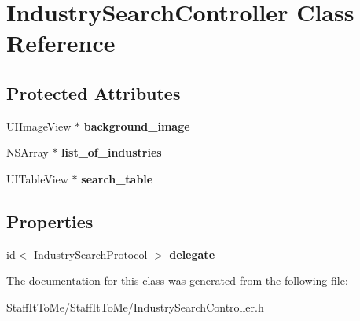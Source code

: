 \hypertarget{interface_industry_search_controller}{
\section{\-Industry\-Search\-Controller \-Class \-Reference}
\label{interface_industry_search_controller}
}
\subsection*{\-Protected \-Attributes}
\begin{DoxyCompactItemize}
\item 
\hypertarget{interface_industry_search_controller_aa442ecdf7c873fde2f8a9e2f973958f0}{
\-U\-I\-Image\-View $\ast$ {\bfseries background\-\_\-image}}
\label{interface_industry_search_controller_aa442ecdf7c873fde2f8a9e2f973958f0}

\item 
\hypertarget{interface_industry_search_controller_a694aebeab9c1d885a5d6d75e6a27cc07}{
\-N\-S\-Array $\ast$ {\bfseries list\-\_\-of\-\_\-industries}}
\label{interface_industry_search_controller_a694aebeab9c1d885a5d6d75e6a27cc07}

\item 
\hypertarget{interface_industry_search_controller_a2f0bcb41f2b6d4ac024094696d67dcb1}{
\-U\-I\-Table\-View $\ast$ {\bfseries search\-\_\-table}}
\label{interface_industry_search_controller_a2f0bcb41f2b6d4ac024094696d67dcb1}

\end{DoxyCompactItemize}
\subsection*{\-Properties}
\begin{DoxyCompactItemize}
\item 
\hypertarget{interface_industry_search_controller_a50d09dc90e7c290a8d621981cfb18fe6}{
id$<$ \hyperlink{protocol_industry_search_protocol-p}{\-Industry\-Search\-Protocol} $>$ {\bfseries delegate}}
\label{interface_industry_search_controller_a50d09dc90e7c290a8d621981cfb18fe6}

\end{DoxyCompactItemize}


\-The documentation for this class was generated from the following file\-:\begin{DoxyCompactItemize}
\item 
\-Staff\-It\-To\-Me/\-Staff\-It\-To\-Me/\-Industry\-Search\-Controller.\-h\end{DoxyCompactItemize}
